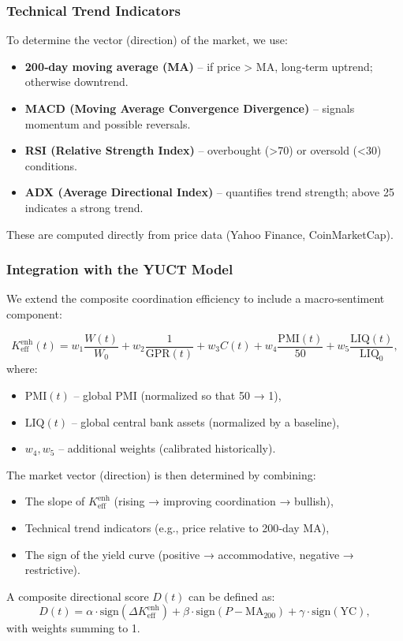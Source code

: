 \documentclass[11pt,a4paper]{article}
\theoremstyle{remark}
\begin{document}
	\subsubsection{Technical Trend Indicators}
	To determine the vector (direction) of the market, we use:
	\begin{itemize}
		\item \textbf{200‑day moving average (MA)} – if price > MA, long‑term uptrend; otherwise downtrend.
		\item \textbf{MACD (Moving Average Convergence Divergence)} – signals momentum and possible reversals.
		\item \textbf{RSI (Relative Strength Index)} – overbought (>70) or oversold (<30) conditions.
		\item \textbf{ADX (Average Directional Index)} – quantifies trend strength; above 25 indicates a strong trend.
	\end{itemize}
	These are computed directly from price data (Yahoo Finance, CoinMarketCap).
	
	\subsubsection{Integration with the YUCT Model}
	
	We extend the composite coordination efficiency to include a macro‑sentiment component:
	
	\begin{equation}
		K_{\mathrm{eff}}^{\text{enh}}(t) = w_1 \frac{W(t)}{W_0} + w_2 \frac{1}{\text{GPR}(t)} + w_3 C(t) + w_4 \frac{\text{PMI}(t)}{50} + w_5 \frac{\text{LIQ}(t)}{\text{LIQ}_0},
		\label{eq:keff_enhanced}
	\end{equation}
	where:
	\begin{itemize}
		\item \(\text{PMI}(t)\) – global PMI (normalized so that 50 → 1),
		\item \(\text{LIQ}(t)\) – global central bank assets (normalized by a baseline),
		\item \(w_4, w_5\) – additional weights (calibrated historically).
	\end{itemize}
	
	The market vector (direction) is then determined by combining:
	\begin{itemize}
		\item The slope of \(K_{\mathrm{eff}}^{\text{enh}}\) (rising → improving coordination → bullish),
		\item Technical trend indicators (e.g., price relative to 200‑day MA),
		\item The sign of the yield curve (positive → accommodative, negative → restrictive).
	\end{itemize}
	A composite directional score \(D(t)\) can be defined as:
	\[
	D(t) = \alpha \cdot \text{sign}(\Delta K_{\mathrm{eff}}^{\text{enh}}) + \beta \cdot \text{sign}(P - \text{MA}_{200}) + \gamma \cdot \text{sign}(\text{YC}),
	\]
	with weights summing to 1.
	
\end{document}
